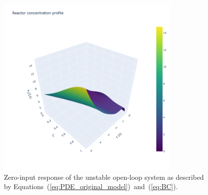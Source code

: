 \DIFdelbegin 
\begin{figure}[!htbp]
    \centering
    \includegraphics[width=0.8\textwidth,trim=0 0 100 0,clip]{Figures/3D_x1_openloop.png}
    \caption{Zero-input response of the unstable open-loop system as described by Equations~(\ref{eq:PDE_original_model})~and~(\ref{eq:BC}).}
    \label{fig:3D_x1_openloop}
\end{figure} 
\DIFdelend

\DIFaddbegin 



